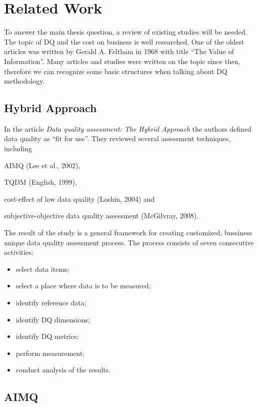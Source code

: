 \chapter{Related Work}\label{ch:related-work}

To answer the main thesis question, a review of existing studies will be needed.
The topic of DQ and the cost on business is well researched.
One of the oldest articles was written by Gerald A. Feltham in 1968 with title \enquote{The Value of Information}.
Many articles and studies were written on the topic since then, therefore we can recognize some basic structures when talking about DQ methodology.

\section{Hybrid Approach}

In the article \textit{Data quality assessment: The Hybrid Approach} the authors defined data quality as \enquote{fit for use}.
They reviewed several assessment techniques, including
\begin{enumerate*}[label=(\roman*)]
    \item AIMQ (Lee et al., 2002),
    \item TQDM (English, 1999),
    \item cost-effect of low data quality (Loshin, 2004) and
    \item subjective-objective data quality assessment (McGilvray, 2008).
\end{enumerate*}

The result of the study is a general framework for creating customized, bussiness unique data quality assessment process.
The process consists of seven consecutive activities:

\begin{itemize}
    \item select data items;
    \item select a place where data is to be measured;
    \item identify reference data;
    \item identify DQ dimensions;
    \item identify DQ metrics;
    \item perform measurement;
    \item conduct analysis of the results.
\end{itemize}

\section{AIMQ}

